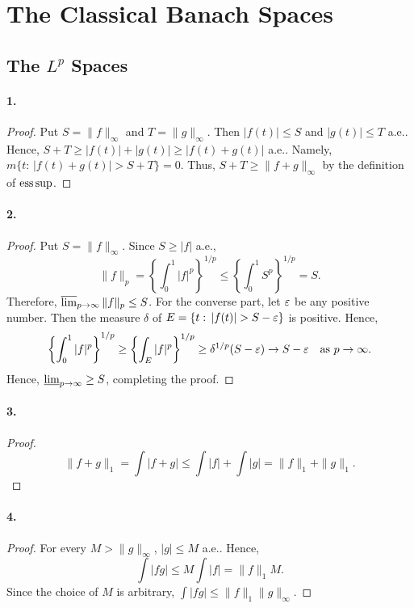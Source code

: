 \section{The Classical Banach Spaces}
\subsection{The $L^p$ Spaces}
  \paragraph{1.}
  \begin{proof}
    Put $S=\|f\|_\infty$ and $T=\|g\|_\infty$. Then $|f(t)|\le S$ and $|g(t)|\le
    T$ a.e.. Hence, $S+T\ge |f(t)|+|g(t)| \ge |f(t)+g(t)|$ a.e.. Namely, $m\{t:
    \,|f(t)+g(t)|>S+T\}=0$. Thus, $S+T\ge \|f+g\|_\infty$ by the definition of 
    $\operatorname*{ess\,sup}$.
  \end{proof}

  \paragraph{2.}
  \begin{proof}
    Put $S=\|f\|_\infty$. Since $S\ge |f|$ a.e., 
    \[
      \|f\|_p=
      \left\{\int_0^1|f|^p\right\}^{1/p} \le 
      \left\{\int_0^1S^p\right\}^{1/p} = S.
    \]
    Therefore, $\operatorname*{\overline{lim}}_{p\to\infty}\|f\|_p \le S$. For the converse part, let 
    $\varepsilon$ be any positive number. Then the measure $\delta$ of $E=\{t:\,|f(t)|>
    S-\vep\}$ is positive. Hence,
    \[
      \left\{\int_0^1|f|^p\right\}^{1/p} \ge
      \left\{\int_E|f|^p\right\}^{1/p} \ge 
      \delta^{1/p}(S-\varepsilon) \to 
      S-\varepsilon\quad\text{as $p\to\infty$.}
    \]
    Hence, $\operatorname*{\underline{lim}}_{p\to\infty}\ge S$, completing the proof.
  \end{proof}

  \paragraph{3.}
  \begin{proof}
    \[
      \|f+g\|_1 = \int|f+g| \le \int|f|+\int|g| = \|f\|_1+\|g\|_1.
    \]
  \end{proof}

  \paragraph{4.}
  \begin{proof}
    For every $M>\|g\|_\infty$, $|g|\le M$ a.e.. Hence,
    \[
      \int|fg|\le M\int|f| = \|f\|_1 M.
    \]
    Since the choice of $M$ is arbitrary, $\int|fg|\le \|f\|_1\|g\|_\infty$.
  \end{proof}

